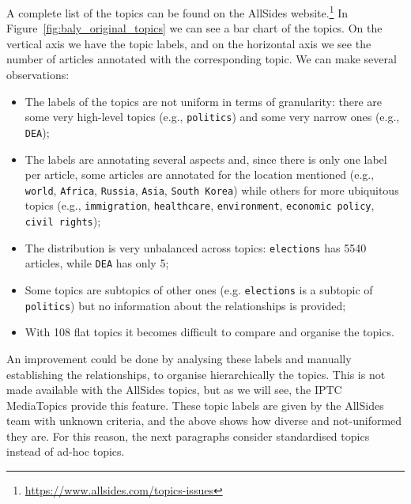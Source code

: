 A complete list of the topics can be found on the AllSides website.\footnote{\url{https://www.allsides.com/topics-issues}}
In Figure~\ref{fig:baly_original_topics}
we can see a bar chart of the topics.
On the vertical axis we have the topic labels, and on the horizontal axis we see the number of articles annotated with the corresponding topic.
We can make several observations:

\begin{itemize}
    \item The labels of the topics are not uniform in terms of granularity: there are some very high-level topics (e.g., \texttt{politics}) and some very narrow ones (e.g., \texttt{DEA});
    \item The labels are annotating several aspects and, since there is only one label per article, some articles are annotated for the location mentioned (e.g., \texttt{world}, \texttt{Africa}, \texttt{Russia}, \texttt{Asia}, \texttt{South Korea}) while others for more ubiquitous topics (e.g., \texttt{immigration}, \texttt{healthcare}, \texttt{environment}, \texttt{economic policy}, \texttt{civil rights}); %
    \item The distribution is very unbalanced across topics: \texttt{elections} has 5540 articles, while \texttt{DEA} has only 5;
    \item Some topics are subtopics of other ones (e.g. \texttt{elections} is a subtopic of \texttt{politics}) but no information about the relationships is provided;
    \item With 108 flat topics it becomes difficult to compare and organise the topics.
\end{itemize}

An improvement could be done by analysing these labels and manually establishing the relationships, to organise hierarchically the topics.
This is not made available with the AllSides topics, but as we will see, the IPTC MediaTopics provide this feature. 
%
%
%
These topic labels are given by the AllSides team with unknown criteria, and the above shows how diverse and not-uniformed they are.
For this reason, the next paragraphs consider standardised topics instead of ad-hoc topics.


